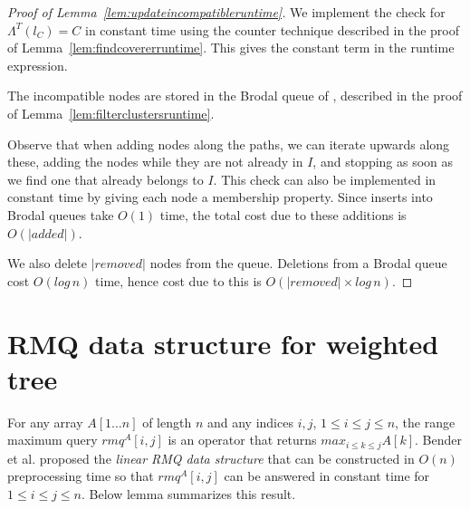 \documentclass[final,1p,times]{elsarticle}
\newcommand{\leafset}{\Lambda}
\newtheorem{theorem}{Theorem}
\begin{document}
    \begin{proof}[Proof of Lemma~\ref{lem:updateincompatibleruntime}]
        We implement the check for $\leafset^{T}(l_C) = C$ in constant time using the counter technique described in the proof of Lemma~\ref{lem:findcovererruntime}. This gives the constant term in the runtime expression.

        The incompatible nodes are stored in the Brodal queue of \cite{brodal1995fast}, described in the proof of Lemma~\ref{lem:filterclustersruntime}.

        Observe that when adding nodes along the paths, we can iterate upwards along these, adding the nodes while they are not already in $I$, and stopping as soon as we find one that already belongs to $I$. This check can also be implemented in constant time by giving each node a membership property. Since inserts into Brodal queues take $O(1)$ time, the total cost due to these additions is $O(|added|)$.

        We also delete $|removed|$ nodes from the queue. Deletions from a Brodal queue cost $O(log\,n)$ time, hence cost due to this is $O(|removed| \times log\,n)$.
    \end{proof}

%

    \section{RMQ data structure for weighted tree}
    \label{sec:rmqtree}

For any array $A[1 \ldots n]$ of length $n$ and any indices $i, j$, $1 \leq i \leq j \leq n$, the range maximum query $rmq^A[i, j]$ is an operator that returns $max_{i \leq k \leq j}A[k]$. Bender et al.\cite{bender2000lca} proposed the \textit{linear RMQ data structure} that can be constructed in $O(n)$ preprocessing time so that $rmq^A[i,j]$ can be answered in constant time for $1 \leq i \leq j \leq n$. Below lemma summarizes this result.
\end{document}
